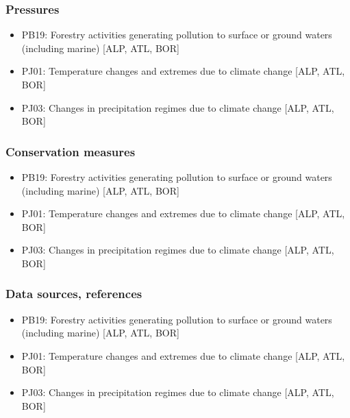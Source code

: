 \documentclass[
  10pt,
  letterpaper,
  DIV=11,
  numbers=noendperiod]{scrartcl}
\providecommand{\tightlist}{%
  \setlength{\itemsep}{0pt}\setlength{\parskip}{0pt}}
\begin{document}
\subsubsection{Pressures}\label{pressures}

\begin{itemize}
\tightlist
\item
  PB19: Forestry activities generating pollution to surface or ground
  waters (including marine) {[}ALP, ATL, BOR{]}
\item
  PJ01: Temperature changes and extremes due to climate change {[}ALP,
  ATL, BOR{]}
\item
  PJ03: Changes in precipitation regimes due to climate change {[}ALP,
  ATL, BOR{]}
\end{itemize}

\subsubsection{Conservation measures}\label{conservation-measures}

\begin{itemize}
\tightlist
\item
  PB19: Forestry activities generating pollution to surface or ground
  waters (including marine) {[}ALP, ATL, BOR{]}
\item
  PJ01: Temperature changes and extremes due to climate change {[}ALP,
  ATL, BOR{]}
\item
  PJ03: Changes in precipitation regimes due to climate change {[}ALP,
  ATL, BOR{]}
\end{itemize}

\subsubsection{Data sources, references}\label{data-sources-references}

\begin{itemize}
\tightlist
\item
  PB19: Forestry activities generating pollution to surface or ground
  waters (including marine) {[}ALP, ATL, BOR{]}
\item
  PJ01: Temperature changes and extremes due to climate change {[}ALP,
  ATL, BOR{]}
\item
  PJ03: Changes in precipitation regimes due to climate change {[}ALP,
  ATL, BOR{]}
\end{itemize}
\end{document}
